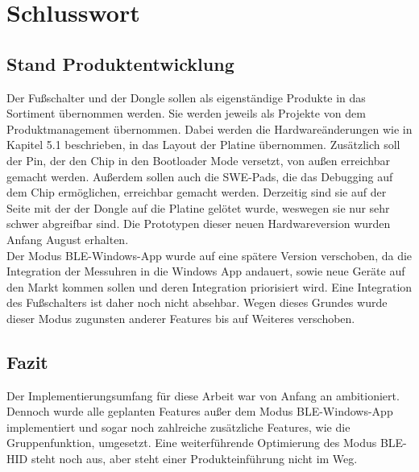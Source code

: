 \section{Schlusswort}

\subsection{Stand Produktentwicklung}
Der Fußschalter und der Dongle sollen als eigenständige Produkte in das Sortiment übernommen werden. Sie werden jeweils als Projekte von dem Produktmanagement übernommen. Dabei werden die Hardwareänderungen wie in Kapitel 5.1 beschrieben, in das Layout der Platine übernommen. Zusätzlich soll der Pin, der den Chip in den Bootloader Mode versetzt, von außen erreichbar gemacht werden. Außerdem sollen auch die SWE-Pads, die das Debugging auf dem Chip ermöglichen, erreichbar gemacht werden. Derzeitig sind sie auf der Seite mit der der Dongle auf die Platine gelötet wurde, weswegen sie nur sehr schwer abgreifbar sind. Die Prototypen dieser neuen Hardwareversion wurden Anfang August erhalten.\\
Der Modus BLE-Windows-App wurde auf eine spätere Version verschoben, da die Integration der Messuhren in die Windows App andauert, sowie neue Geräte auf den Markt kommen sollen und deren Integration priorisiert wird. Eine Integration des Fußschalters ist daher noch nicht absehbar. Wegen dieses Grundes wurde dieser Modus zugunsten anderer Features bis auf Weiteres verschoben. 

\subsection{Fazit}
Der Implementierungsumfang für diese Arbeit war von Anfang an ambitioniert. Dennoch wurde alle geplanten Features außer dem Modus BLE-Windows-App implementiert und sogar noch zahlreiche zusätzliche Features, wie die Gruppenfunktion, umgesetzt. Eine weiterführende Optimierung des Modus BLE-HID steht noch aus, aber steht einer Produkteinführung nicht im Weg.